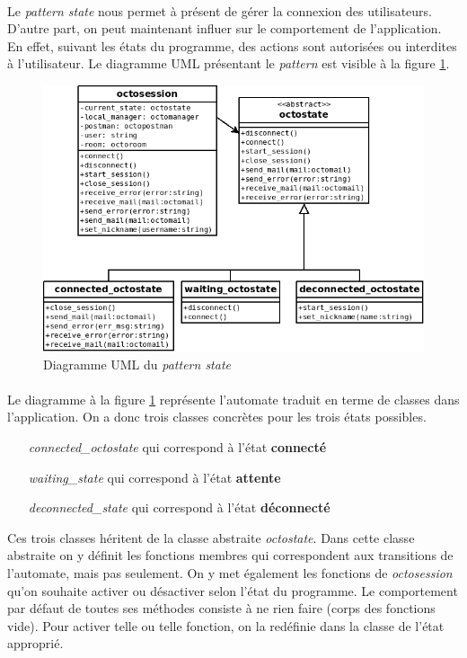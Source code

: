 \documentclass[a4paper]{article}
\begin{document}
			\paragraph{}{
			Le \textit{pattern state} nous permet à présent de gérer la connexion des utilisateurs. D'autre part,
			on peut maintenant influer sur le comportement de l'application. En effet, suivant les états du programme,
			des actions sont autorisées ou interdites à l'utilisateur. Le diagramme UML présentant le \textit{pattern}
			est visible à la figure \ref{state_uml}.
			}
			
			\begin{figure}[!ht]
				\centering
				\includegraphics[scale=0.6]{UML/octosession_state.png}
				\caption{\label{state_uml} Diagramme UML du \textit{pattern state}}
			\end{figure}
			
			\paragraph{}{
			Le diagramme à la figure \ref{state_uml} représente l'automate traduit en terme de classes dans l'application.
			On a donc trois classes concrètes pour les trois états possibles.
			    \begin{itemize}
			        \item[\textit{connected\_octostate}] qui correspond à l'état \textbf{connecté}
			        \item[\textit{waiting\_state}] qui correspond à l'état \textbf{attente}
			        \item[\textit{deconnected\_state}] qui correspond à l'état \textbf{déconnecté}
			    \end{itemize}
			Ces trois classes héritent de la classe abstraite \textit{octostate}. Dans cette classe abstraite on y définit
			les fonctions membres qui correspondent aux transitions de l'automate, mais pas seulement. On y met également les
			fonctions de \textit{octosession} qu'on souhaite activer ou désactiver selon l'état du programme. Le comportement
			par défaut de toutes ses méthodes consiste à ne rien faire (corps des fonctions vide). Pour activer telle ou
			telle fonction, on la redéfinie dans la classe de l'état approprié.
			}
\end{document}
